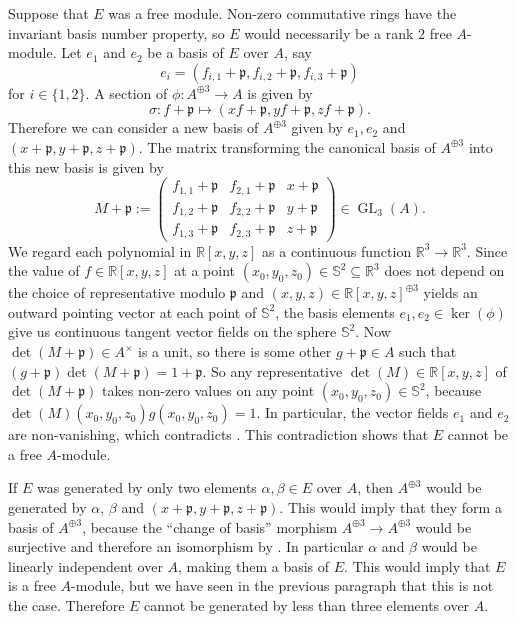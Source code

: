 \documentclass[A4paper, 12pt, british, reqno]{amsart}
\newcommand{\R}{\mathbb{R}} %
\newcommand{\bbS}{\mathbb{S}}
\newcommand{\p}{\mathfrak{p}}
\theoremstyle{plain}
\theoremstyle{definition}
\theoremstyle{remark}
\theoremstyle{plain}
\theoremstyle{definition}
\theoremstyle{remark}
\theoremstyle{plain}
\theoremstyle{definition}
\theoremstyle{remark}
\newcommand{\op}{\oplus}
\begin{document}
Suppose that $E$ was a free module.
Non-zero commutative rings have the invariant basis number property, so $E$ would necessarily be a rank $2$ free $A$-module.
Let $e_{1}$ and $e_{2}$ be a basis of $E$ over $A$, say
\[ e_{i}=(f_{i,1}+\p,f_{i,2}+\p,f_{i,3}+\p) \]
for $i\in \{1,2\}$.
A section of $\phi\colon A^{\op 3}\to A$ is given by
\[ \sigma\colon f+\p \longmapsto (xf+\p,yf+\p,zf+\p). \]
Therefore we can consider a new basis of $A^{\op 3}$ given by $e_{1},e_{2}$ and $(x+\p,y+\p,z+\p)$.
The matrix transforming the canonical basis of $A^{\op 3}$ into this new basis is given by
\[ M+\p:=\begin{pmatrix} f_{1,1}+\p & f_{2,1}+\p & x+\p \\
    f_{1,2}+\p & f_{2,2}+\p & y+\p \\
    f_{1,3}+\p & f_{2,3}+\p & z+\p
\end{pmatrix} \in \operatorname{GL}_{3}(A). \]
We regard each polynomial in $\R[x,y,z]$ as a continuous function $\R^{3}\to \R^{3}$.
Since the value of $f\in \R[x,y,z]$ at a point $(x_{0},y_{0},z_{0})\in \bbS^{2}\subseteq \R^{3}$ does not depend on the choice of representative modulo $\p$ and $(x,y,z)\in \R[x,y,z]^{\op 3}$ yields an outward pointing vector at each point of $\bbS^{2}$, the basis elements $e_{1},e_{2}\in \ker(\phi)$ give us continuous tangent vector fields on the sphere $\bbS^{2}$.
Now $\det(M+\p)\in A^{\times}$ is a unit, so there is some other $g+\p\in A$ such that $(g+\p)\det(M+\p)=1+\p$.
So any representative $\det(M)\in\R[x,y,z]$ of $\det(M+\p)$ takes non-zero values on any point $(x_{0},y_{0},z_{0})\in \bbS^{2}$, because $\det(M)(x_{0},y_{0},z_{0})g(x_{0},y_{0},z_{0})=1$.
In particular, the vector fields $e_{1}$ and $e_{2}$ are non-vanishing, which contradicts .
This contradiction shows that $E$ cannot be a free $A$-module.

If $E$ was generated by only two elements $\alpha,\beta\in E$ over $A$, then $A^{\op 3}$ would be generated by $\alpha$, $\beta$ and $(x+\p,y+\p,z+\p)$.
This would imply that they form a basis of $A^{\op 3}$, because the ``change of basis'' morphism $A^{\op 3}\to A^{\op 3}$ would be surjective and therefore an isomorphism by \cite[Exercise 1 in \S 6]{am69}.
In particular $\alpha$ and $\beta$ would be linearly independent over $A$, making them a basis of $E$.
This would imply that $E$ is a free $A$-module, but we have seen in the previous paragraph that this is not the case.
Therefore $E$ cannot be generated by less than three elements over $A$.
\end{document}
